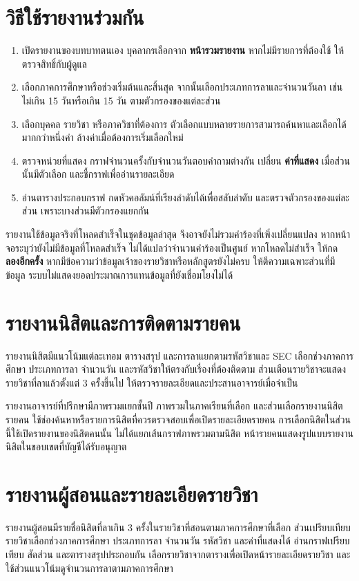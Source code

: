 \documentclass[17pt,a4paper]{extreport}
\begin{document}
\section{วิธีใช้รายงานร่วมกัน}
\begin{enumerate}
  \item เปิดรายงานของบทบาทตนเอง บุคลากรเลือกจาก \textbf{หน้ารวมรายงาน} หากไม่มีรายการที่ต้องใช้ ให้ตรวจสิทธิ์กับผู้ดูแล
  \item เลือกภาคการศึกษาหรือช่วงเริ่มต้นและสิ้นสุด จากนั้นเลือกประเภทการลาและจำนวนวันลา เช่น ไม่เกิน 15 วันหรือเกิน 15 วัน ตามตัวกรองของแต่ละส่วน
  \item เลือกบุคคล รายวิชา หรือภาควิชาที่ต้องการ ตัวเลือกแบบหลายรายการสามารถค้นหาและเลือกได้มากกว่าหนึ่งค่า ล้างค่าเมื่อต้องการเริ่มเลือกใหม่
  \item ตรวจหน่วยที่แสดง กราฟจำนวนครั้งกับจำนวนวันตอบคำถามต่างกัน เปลี่ยน \textbf{ค่าที่แสดง} เมื่อส่วนนั้นมีตัวเลือก และชี้กราฟเพื่ออ่านรายละเอียด
  \item อ่านตารางประกอบกราฟ กดหัวคอลัมน์ที่เรียงลำดับได้เพื่อสลับลำดับ และตรวจตัวกรองของแต่ละส่วน เพราะบางส่วนมีตัวกรองแยกกัน
\end{enumerate}
รายงานใช้ข้อมูลจริงที่โหลดสำเร็จในชุดข้อมูลล่าสุด จึงอาจยังไม่รวมคำร้องที่เพิ่งเปลี่ยนแปลง หากหน้าจอระบุว่ายังไม่มีข้อมูลที่โหลดสำเร็จ ไม่ได้แปลว่าจำนวนคำร้องเป็นศูนย์ หากโหลดไม่สำเร็จ ให้กด \textbf{ลองอีกครั้ง} หากมีข้อความว่าข้อมูลเจ้าของรายวิชาหรือหลักสูตรยังไม่ครบ ให้ตีความเฉพาะส่วนที่มีข้อมูล ระบบไม่แสดงยอดประมาณการแทนข้อมูลที่ยังเชื่อมโยงไม่ได้

\section{รายงานนิสิตและการติดตามรายคน}
รายงานนิสิตมีแนวโน้มแต่ละเทอม ตารางสรุป และการลาแยกตามรหัสวิชาและ SEC เลือกช่วงภาคการศึกษา ประเภทการลา จำนวนวัน และรหัสวิชาให้ตรงกับเรื่องที่ต้องติดตาม ส่วนเตือนรายวิชาจะแสดงรายวิชาที่ลาแล้วตั้งแต่ 3 ครั้งขึ้นไป ให้ตรวจรายละเอียดและประสานอาจารย์เมื่อจำเป็น

รายงานอาจารย์ที่ปรึกษามีภาพรวมแยกชั้นปี ภาพรวมในภาคเรียนที่เลือก และส่วนเลือกรายงานนิสิตรายคน ใช้ช่องค้นหาหรือรายการนิสิตที่ควรตรวจสอบเพื่อเปิดรายละเอียดรายคน การเลือกนิสิตในส่วนนี้ใช้เปิดรายงานของนิสิตคนนั้น ไม่ได้แยกเส้นกราฟภาพรวมตามนิสิต หน้ารายคนแสดงรูปแบบรายงานนิสิตในขอบเขตที่บัญชีได้รับอนุญาต

\section{รายงานผู้สอนและรายละเอียดรายวิชา}
รายงานผู้สอนมีรายชื่อนิสิตที่ลาเกิน 3 ครั้งในรายวิชาที่สอนตามภาคการศึกษาที่เลือก ส่วนเปรียบเทียบรายวิชาเลือกช่วงภาคการศึกษา ประเภทการลา จำนวนวัน รหัสวิชา และค่าที่แสดงได้ อ่านกราฟเปรียบเทียบ สัดส่วน และตารางสรุปประกอบกัน เลือกรายวิชาจากตารางเพื่อเปิดหน้ารายละเอียดรายวิชา และใช้ส่วนแนวโน้มดูจำนวนการลาตามภาคการศึกษา
\end{document}
